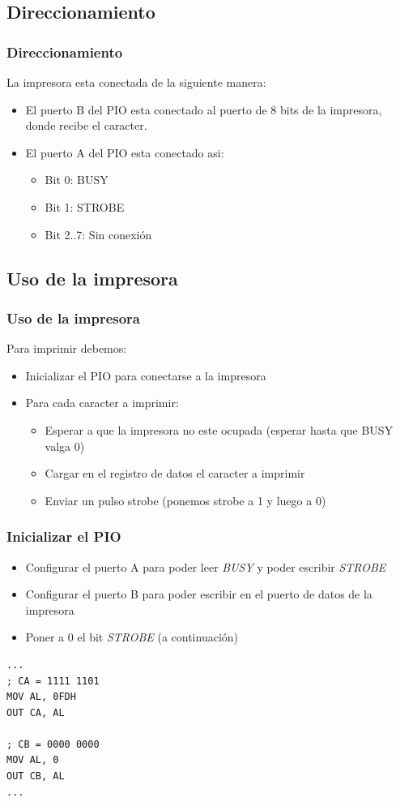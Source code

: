 \documentclass{beamer}
\begin{document}
\subsection{Direccionamiento}
\begin{frame}
\frametitle{Direccionamiento}
La impresora esta conectada de la siguiente manera:
\begin{itemize}
    \item El puerto B del PIO esta conectado al puerto de 8 bits de la impresora, donde recibe el caracter.
    \item El puerto A del PIO esta conectado asi:
\begin{itemize}
    \item Bit 0: BUSY
    \item Bit 1: STROBE
    \item Bit 2..7: Sin conexión
\end{itemize}
\end{itemize}
\end{frame}

\subsection{Uso de la impresora}
\begin{frame}
\frametitle{Uso de la impresora}
Para imprimir debemos:
\begin{itemize}
    \item Inicializar el PIO para conectarse a la impresora
    \item Para cada caracter a imprimir:
\begin{itemize}
    \item Esperar a que la impresora no este ocupada (esperar hasta que BUSY valga 0)
    \item Cargar en el registro de datos el caracter a imprimir
    \item Enviar un pulso strobe (ponemos strobe a 1 y luego a 0)
\end{itemize}
\end{itemize}
\end{frame}

\begin{frame}[fragile]
\frametitle{Inicializar el PIO}
\begin{itemize}
    \item Configurar el puerto A para poder leer \emph{BUSY} y poder escribir \emph{STROBE}
    \item Configurar el puerto B para poder escribir en el puerto de datos de la impresora
    \item Poner a 0 el bit \emph{STROBE} (a continuación)
\end{itemize}
\begin{block}{}
\begin{verbatim}
...
; CA = 1111 1101
MOV AL, 0FDH
OUT CA, AL

; CB = 0000 0000
MOV AL, 0
OUT CB, AL
...
\end{verbatim}
\end{block}
\end{frame}
\end{document}
